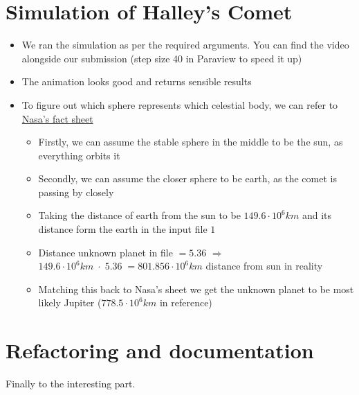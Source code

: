 \documentclass{article}
\begin{document}
\section{Simulation of Halley's Comet}

\begin{itemize}
    \item We ran the simulation as per the required arguments. You can find the video alongside our submission (step size 40 in Paraview to speed it up)
    \item The animation looks good and returns sensible results
    \item To figure out which sphere represents which celestial body, we can refer to \href{https://nssdc.gsfc.nasa.gov/planetary/factsheet/}{Nasa's fact sheet}
    \begin{itemize}
        \item Firstly, we can assume the stable sphere in the middle to be the sun, as everything orbits it
        \item Secondly, we can assume the closer sphere to be earth, as the comet is passing by closely
        \item Taking the distance of earth from the sun to be $149.6 \cdot 10^6 km$ and its distance form the earth in the input file $1$
        \item Distance unknown planet in file $= 5.36$ $\Rightarrow$ $149.6 \cdot 10^6 km \; \cdot \; 5.36 \; = 801.856 \cdot 10^6 km$ distance from sun in reality
        \item Matching this back to Nasa's sheet we get the unknown planet to be most likely Jupiter ($778.5 \cdot 10^6 km$ in reference)
    \end{itemize}    
\end{itemize}

\section{Refactoring and documentation}
\label{sec:Refactoring}

Finally to the interesting part.
\end{document}
